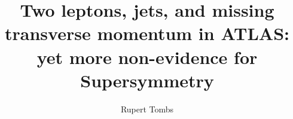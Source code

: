 \documentclass[nobind,draft,oneside]{minithesis}
\title{%
Two leptons, jets, and missing transverse momentum in ATLAS:
yet more non-evidence for Supersymmetry
}
\author{Rupert Tombs}
\begin{document}
\begin{frontmatter}

\end{frontmatter}


\begin{mainmatter}

\end{mainmatter}


\begin{appendices}

\end{appendices}


\begin{backmatter}

\end{backmatter}
\end{document}
